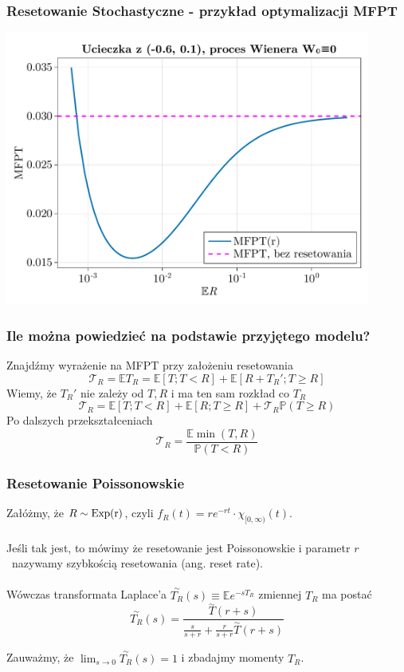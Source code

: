 \documentclass{beamer}
\newcommand{\p}{\mathbb{P}}
\newcommand{\E}{\mathbb{E}}
\newcommand{\1}{\mathbb{1}}
\newcommand{\T}{\mathcal{T}}
\newcommand{\Lap}[1]{\overset{\sim}{#1}}
\begin{document}
\begin{frame}
\frametitle{Resetowanie Stochastyczne - przykład optymalizacji MFPT}
\includegraphics[width=0.9\textwidth]{wiener-sim/MFPT-r.pdf}
\end{frame}


\begin{frame}
\frametitle{Ile można powiedzieć na podstawie przyjętego modelu?}
Znajdźmy wyrażenie na MFPT przy założeniu resetowania
\begin{equation}
\T_R = \E T_R = \E [T ; T < R] + \E [R + T_R' ; T \ge  R]
\end{equation}
\pause
Wiemy, że $T_R'$ nie zależy od $T, R$ i ma ten sam rozkład co $T_R$
\begin{equation}
\T_R = \E [T ; T < R] + \E [R; T \ge  R] + \T_R \p( T \ge  R)
\end{equation}
\pause
Po dalszych przekształceniach
\begin{equation}
\boxed{   \T_R = \frac{\E \min{(T, R)}}{\p(T < R)}   }
\end{equation}
\end{frame}

\begin{frame}
\frametitle{Resetowanie Poissonowskie}
Załóżmy, że $R \sim \rm{Exp}(r)$, czyli $f_R(t) = r e^{-rt} \cdot \chi_{[0, \infty)}(t)$.\\~\\
Jeśli tak jest, to mówimy że resetowanie jest Poissonowskie i parametr $r$~nazywamy szybkością resetowania (ang. reset rate).\\~\\
\pause
Wówczas transformata Laplace'a $\Lap{T_R}(s) \equiv \E e^{-sT_R}$ zmiennej $T_R$ ma postać\footnotemark{}
\begin{equation}
\Lap{T_R}(s) = \frac{\Lap{T}(r+s)} {\frac{s}{s+r} + \frac{r}{s+r} \Lap{T}(r+s)}
\end{equation}

\vfill
Zauważmy, że $\lim_{s \to 0} \Lap{T_R}(s) = 1$ i zbadajmy momenty $T_R$.

\end{frame}
\end{document}
